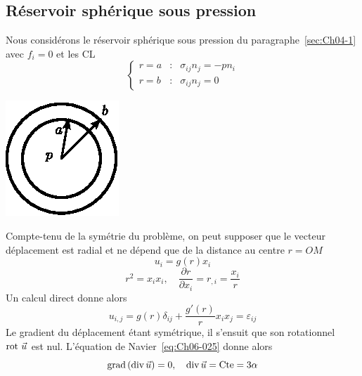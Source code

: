 \subsection{Réservoir sphérique sous pression}
\begin{multicols}{2}
    Nous considérons le réservoir sphérique sous pression du paragraphe~\ref{sec:Ch04-1} avec $f_i = 0$ et les CL
    \begin{equation}
        \left\{
        \begin{aligned}
            r=a &:& \sigma_{ij} n_j = -p n_i \\
            r=b &:& \sigma_{ij} n_j = 0
        \end{aligned}
        \right.
        \label{eq:Ch06-042}
    \end{equation}
    \columnbreak
    \begin{center}
        \includegraphics{../images/T1_Ch06-03}
    \end{center}
\end{multicols}
Compte-tenu de la symétrie du problème, on peut supposer que le vecteur déplacement est radial et ne dépend que de la distance au centre $r=OM$
\begin{equation}
    u_i = g(r) x_i
    \label{eq:Ch04-043}
\end{equation}
\begin{equation}
    r^2 = x_i x_i,\quad \frac{\partial r}{\partial x_i} = r_{,i} = \frac{x_i}{r}
    \label{eq:Ch04-044}
\end{equation}
Un calcul direct donne alors
\begin{equation}
    u_{i,j} = g(r) \delta_{ij} + \frac{g'(r)}{r} x_i x_j = \varepsilon_{ij}
    \label{eq:Ch06-045}
\end{equation}
Le gradient du déplacement étant symétrique, il s'ensuit que son rotationnel $\operatorname*{\mathrm{rot}\,} \vec{u}$ est nul.
L'équation de Navier~\eqref{eq:Ch06-025} donne alors
\begin{equation}
    \operatorname*{\mathrm{grad}} \left( \operatorname*{\mathrm{div}} \vec{u} \right) = 0 ,\quad \operatorname*{\mathrm{div}} \vec{u} = \text{Cte} = 3 \alpha
    \label{eq:Ch06-046}
\end{equation}
